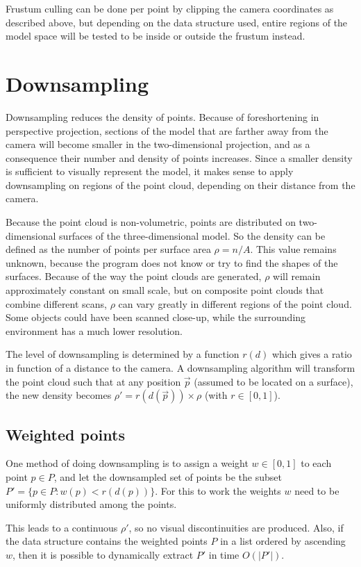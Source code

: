 \documentclass[a4paper,10pt,abstracton,notitlepage]{scrreprt}
\begin{document}
Frustum culling can be done per point by clipping the camera coordinates as described above, but depending on the data structure used, entire regions of the model space will be tested to be inside or outside the frustum instead.


\section{Downsampling}
Downsampling reduces the density of points. Because of foreshortening in perspective projection, sections of the model that are farther away from the camera will become smaller in the two-dimensional projection, and as a consequence their number and density of points increases. Since a smaller density is sufficient to visually represent the model, it makes sense to apply downsampling on regions of the point cloud, depending on their distance from the camera.

Because the point cloud is non-volumetric, points are distributed on two-dimensional surfaces of the three-dimensional model. So the density can be defined as the number of points per surface area $\rho = n/A$. This value remains unknown, because the program does not know or try to find the shapes of the surfaces. Because of the way the point clouds are generated, $\rho$ will remain approximately constant on small scale, but on composite point clouds that combine different scans, $\rho$ can vary greatly in different regions of the point cloud. Some objects could have been scanned close-up, while the surrounding environment has a much lower resolution. 

The level of downsampling is determined by a function $r(d)$ which gives a ratio in function of a distance to the camera. A downsampling algorithm will transform the point cloud such that at any position $\overrightarrow{p}$ (assumed to be located on a surface), the new density becomes $\rho' = r(d(\overrightarrow{p})) \times \rho$ (with $r \in [0, 1]$).

\subsection{Weighted points}
One method of doing downsampling is to assign a weight $w \in [0, 1]$ to each point $p \in P$, and let the downsampled set of points be the subset $P' = \{ p \in P : w(p) < r(d(p)) \}$. For this to work the weights $w$ need to be uniformly distributed among the points.

This leads to a continuous $\rho'$, so no visual discontinuities are produced. Also, if the data structure contains the weighted points $P$ in a list ordered by ascending $w$, then it is possible to dynamically extract $P'$ in time $O(|P'|)$.
\end{document}
